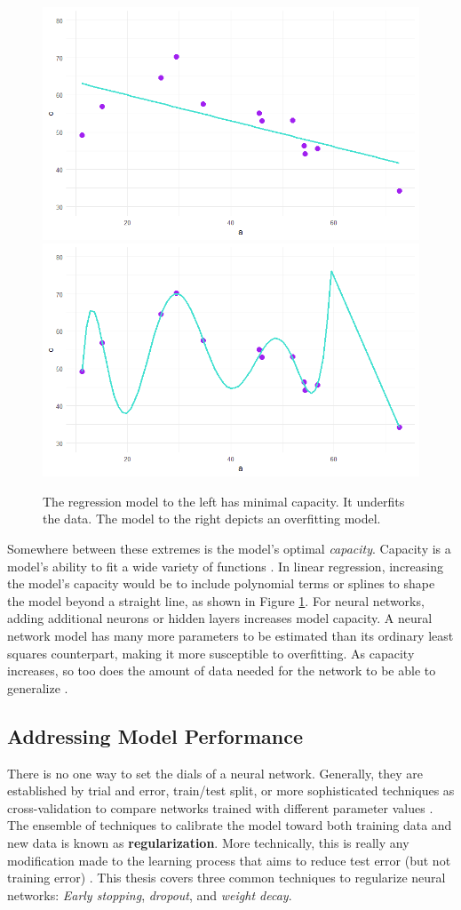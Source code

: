  \begin{figure}[H]
    \includegraphics[width=0.5\linewidth]{Figures/underfit.png}
    \includegraphics[width=0.5\linewidth]{Figures/overfit.png}
    \vspace{-20pt}
    \caption{\footnotesize{The regression model to the left has minimal capacity.  It underfits the data. The model to the right depicts an overfitting model.}}
    \label{capacityviz}
\end{figure}
 
 Somewhere between these extremes is the model's optimal \textit{capacity}.  Capacity is a model's ability to fit a wide variety of functions \cite{Goodfellow-et-al-2016}.  In linear regression, increasing the model's capacity would be to include polynomial terms or splines to shape the model beyond a straight line, as shown in Figure \ref{capacityviz}.  For neural networks, adding additional neurons or hidden layers increases model capacity. 
 A neural network model has many more parameters to be estimated than its ordinary least squares counterpart, making it more susceptible to overfitting.  As capacity increases, so too does the amount of data needed for the network to be able to generalize \cite{baum1988size}.


\subsection{Addressing Model Performance}

There is no one way to set the dials of a neural network.  Generally, they are established by trial and error, train/test split, or more sophisticated techniques as cross-validation to compare networks trained with different parameter values \cite{mackay1992practical}.  The ensemble of techniques to calibrate the model toward both training data and new data is known as \textbf{regularization}.  More technically, this is really any modification made to the learning process that aims to reduce test error (but not training error) \cite{Goodfellow-et-al-2016}.  This thesis covers three common techniques to regularize neural networks: \textit{Early stopping}, \textit{dropout}, and \textit{weight decay}.

